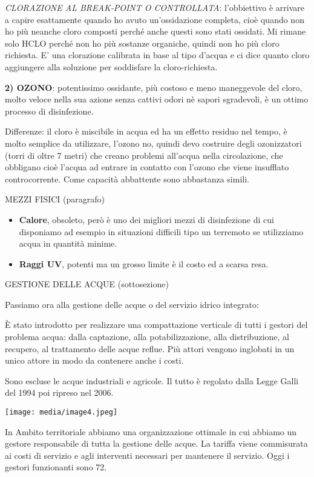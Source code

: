 \documentclass[]{article}
\begin{document}
\emph{CLORAZIONE AL BREAK-POINT O CONTROLLATA}: l'obbiettivo è arrivare
a capire esattamente quando ho avuto un'ossidazione completa, cioè
quando non ho più neanche cloro composti perché anche questi sono stati
ossidati. Mi rimane solo HCLO perché non ho più sostanze organiche,
quindi non ho più cloro richiesta. E' una clorazione calibrata in base
al tipo d'acqua e ci dice quanto cloro aggiungere alla soluzione per
soddisfare la cloro-richiesta.

\textbf{2) OZONO}: potentissimo ossidante, più costoso e meno
maneggevole del cloro, molto veloce nella sua azione senza cattivi odori
nè sapori sgradevoli, è un ottimo processo di disinfezione.

Differenze: il cloro è miscibile in acqua ed ha un effetto residuo nel
tempo, è molto semplice da utilizzare, l'ozono no, quindi devo costruire
degli ozonizzatori (torri di oltre 7 metri) che creano problemi
all'acqua nella circolazione, che obbligano cioè l'acqua ad entrare in
contatto con l'ozono che viene insufflato controcorrente. Come capacità
abbattente sono abbastanza simili.

MEZZI FISICI (paragrafo)

\begin{itemize}
\item
  \textbf{Calore}, obsoleto, però è uno dei migliori mezzi di
  disinfezione di cui disponiamo ad esempio in situazioni difficili tipo
  un terremoto se utilizziamo acqua in quantità minime.
\item
  \textbf{Raggi UV}, potenti ma un grosso limite è il costo ed a scarsa
  resa.
\end{itemize}

GESTIONE DELLE ACQUE (sottosezione)

Passiamo ora alla gestione delle acque o del servizio idrico integrato:

È stato introdotto per realizzare una compattazione verticale di tutti i
gestori del problema acqua: dalla captazione, alla potabilizzazione,
alla distribuzione, al recupero, al trattamento delle acque reflue. Più
attori vengono inglobati in un unico attore in modo da contenere anche i
costi.

Sono escluse le acque industriali e agricole. Il tutto è regolato dalla
Legge Galli del 1994 poi ripreso nel 2006.

\texttt{[image: media/image4.jpeg]}

In Ambito territoriale abbiamo una organizzazione ottimale in cui
abbiamo un gestore responsabile di tutta la gestione delle acque. La
tariffa viene commisurata ai costi di servizio e agli interventi
necessari per mantenere il servizio. Oggi i gestori funzionanti sono 72.
\end{document}
